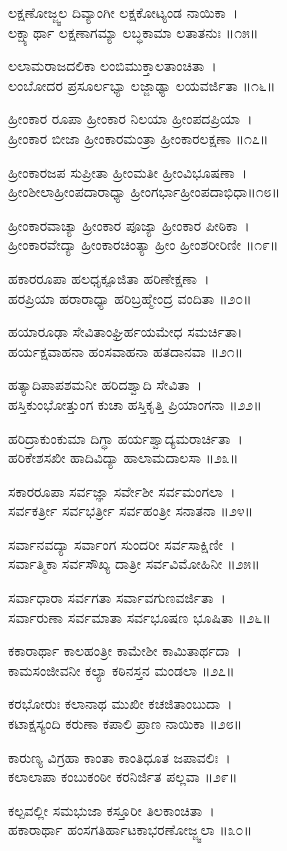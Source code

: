 {ಲಕ್ಷಣೋಜ್ಜ್ವಲ ದಿವ್ಯಾಂಗೀ ಲಕ್ಷಕೋಟ್ಯಂಡ ನಾಯಿಕಾ~।\\
ಲಕ್ಷ್ಯಾರ್ಥಾ ಲಕ್ಷಣಾಗಮ್ಯಾ ಲಬ್ಧಕಾಮಾ ಲತಾತನುಃ ॥೧೫॥

ಲಲಾಮರಾಜದಲಿಕಾ ಲಂಬಿಮುಕ್ತಾಲತಾಂಚಿತಾ~।\\
ಲಂಬೋದರ ಪ್ರಸೂರ್ಲಭ್ಯಾ ಲಜ್ಜಾಢ್ಯಾ ಲಯವರ್ಜಿತಾ ॥೧೬॥

ಹ್ರೀಂಕಾರ ರೂಪಾ ಹ್ರೀಂಕಾರ ನಿಲಯಾ ಹ್ರೀಂಪದಪ್ರಿಯಾ~।\\
ಹ್ರೀಂಕಾರ ಬೀಜಾ ಹ್ರೀಂಕಾರಮಂತ್ರಾ ಹ್ರೀಂಕಾರಲಕ್ಷಣಾ ॥೧೭॥

ಹ್ರೀಂಕಾರಜಪ ಸುಪ್ರೀತಾ ಹ್ರೀಂಮತೀ ಹ್ರೀಂವಿಭೂಷಣಾ~।\\
ಹ್ರೀಂಶೀಲಾಹ್ರೀಂಪದಾರಾಧ್ಯಾ ಹ್ರೀಂಗರ್ಭಾಹ್ರೀಂಪದಾಭಿಧಾ॥೧೮॥

ಹ್ರೀಂಕಾರವಾಚ್ಯಾ ಹ್ರೀಂಕಾರ ಪೂಜ್ಯಾ ಹ್ರೀಂಕಾರ ಪೀಠಿಕಾ~।\\
ಹ್ರೀಂಕಾರವೇದ್ಯಾ ಹ್ರೀಂಕಾರಚಿಂತ್ಯಾ ಹ್ರೀಂ ಹ್ರೀಂಶರೀರಿಣೀ ॥೧೯॥

ಹಕಾರರೂಪಾ ಹಲಧೃಕ್ಪೂಜಿತಾ ಹರಿಣೇಕ್ಷಣಾ~।\\
ಹರಪ್ರಿಯಾ ಹರಾರಾಧ್ಯಾ ಹರಿಬ್ರಹ್ಮೇಂದ್ರ ವಂದಿತಾ ॥೨೦॥

ಹಯಾರೂಢಾ ಸೇವಿತಾಂಘ್ರಿರ್ಹಯಮೇಧ ಸಮರ್ಚಿತಾ।\\
ಹರ್ಯಕ್ಷವಾಹನಾ ಹಂಸವಾಹನಾ ಹತದಾನವಾ ॥೨೧॥

ಹತ್ಯಾದಿಪಾಪಶಮನೀ ಹರಿದಶ್ವಾದಿ ಸೇವಿತಾ~।\\
ಹಸ್ತಿಕುಂಭೋತ್ತುಂಗ ಕುಚಾ ಹಸ್ತಿಕೃತ್ತಿ ಪ್ರಿಯಾಂಗನಾ ॥೨೨॥

ಹರಿದ್ರಾಕುಂಕುಮಾ ದಿಗ್ಧಾ ಹರ್ಯಶ್ವಾದ್ಯಮರಾರ್ಚಿತಾ~।\\
ಹರಿಕೇಶಸಖೀ ಹಾದಿವಿದ್ಯಾ ಹಾಲಾಮದಾಲಸಾ ॥೨೩॥

ಸಕಾರರೂಪಾ ಸರ್ವಜ್ಞಾ ಸರ್ವೇಶೀ ಸರ್ವಮಂಗಲಾ~।\\
ಸರ್ವಕರ್ತ್ರೀ ಸರ್ವಭರ್ತ್ರೀ ಸರ್ವಹಂತ್ರೀ ಸನಾತನಾ ॥೨೪॥

ಸರ್ವಾನವದ್ಯಾ ಸರ್ವಾಂಗ ಸುಂದರೀ ಸರ್ವಸಾಕ್ಷಿಣೀ~।\\
ಸರ್ವಾತ್ಮಿಕಾ ಸರ್ವಸೌಖ್ಯ ದಾತ್ರೀ ಸರ್ವವಿಮೋಹಿನೀ ॥೨೫॥

ಸರ್ವಾಧಾರಾ ಸರ್ವಗತಾ ಸರ್ವಾವಗುಣವರ್ಜಿತಾ~।\\
ಸರ್ವಾರುಣಾ ಸರ್ವಮಾತಾ ಸರ್ವಭೂಷಣ ಭೂಷಿತಾ ॥೨೬॥

ಕಕಾರಾರ್ಥಾ ಕಾಲಹಂತ್ರೀ ಕಾಮೇಶೀ ಕಾಮಿತಾರ್ಥದಾ~।\\
ಕಾಮಸಂಜೀವನೀ ಕಲ್ಯಾ ಕಠಿನಸ್ತನ ಮಂಡಲಾ ॥೨೭॥

ಕರಭೋರುಃ ಕಲಾನಾಥ ಮುಖೀ ಕಚಜಿತಾಂಬುದಾ~।\\
ಕಟಾಕ್ಷಸ್ಯಂದಿ ಕರುಣಾ ಕಪಾಲಿ ಪ್ರಾಣ ನಾಯಿಕಾ ॥೨೮॥

ಕಾರುಣ್ಯ ವಿಗ್ರಹಾ ಕಾಂತಾ ಕಾಂತಿಧೂತ ಜಪಾವಲಿಃ~।\\
ಕಲಾಲಾಪಾ ಕಂಬುಕಂಠೀ ಕರನಿರ್ಜಿತ ಪಲ್ಲವಾ ॥೨೯॥

ಕಲ್ಪವಲ್ಲೀ ಸಮಭುಜಾ ಕಸ್ತೂರೀ ತಿಲಕಾಂಚಿತಾ~।\\
ಹಕಾರಾರ್ಥಾ ಹಂಸಗತಿರ್ಹಾಟಕಾಭರಣೋಜ್ಜ್ವಲಾ ॥೩೦॥

}
